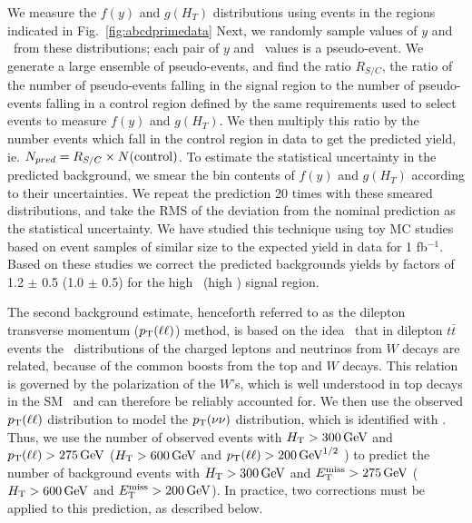 We measure the $f(y)$ and $g(H_T)$ distributions using events in the regions indicated in Fig.~\ref{fig:abcdprimedata}
Next, we randomly sample values of $y$ and \Ht\ from these distributions; each pair of $y$ and \Ht\ values is a pseudo-event.
We generate a large ensemble of pseudo-events, and find the ratio $R_{S/C}$, the ratio of the
number of pseudo-events falling in the signal region to the number of pseudo-events
falling in a control region defined by the same requirements used to select events
to measure $f(y)$ and $g(H_T)$. We then
multiply this ratio by the number events which fall in the control region in data
to get the predicted yield, ie. $N_{pred} = R_{S/C} \times N({\rm control})$. 
To estimate the statistical uncertainty in the predicted background, we smear the bin contents
of $f(y)$ and $g(H_T)$ according to their uncertainties. We repeat the prediction 20 times
with these smeared distributions, and take the RMS of the deviation from the nominal prediction
as the statistical uncertainty. We have studied this technique using toy MC studies based on
event samples of similar size to the expected yield in data for 1 fb$^{-1}$.
Based on these studies we correct the predicted backgrounds yields by factors of 1.2 $\pm$ 0.5
(1.0 $\pm$ 0.5) for the high \MET\ (high \Ht) signal region.


The second  background estimate, henceforth referred to as the dilepton transverse momentum ($p_{\mathrm{T}}(\ell\ell)$) method, 
is  based on the  idea~\cite{ref:victory} that  in dilepton  $t\bar{t}$  events the
\pt\  distributions of  the charged  leptons and  neutrinos  from $W$
decays are  related, because of the  common boosts from  the top  and $W$
decays.  This relation  is governed by the polarization  of the $W$'s,
which         is         well         understood        in         top
decays in the SM~\cite{Wpolarization,Wpolarization2}   and   can  therefore   be
reliably  accounted   for.   We then  use   the  observed
$p_{\mathrm{T}}(\ell\ell)$ distribution to  model the $p_{\mathrm{T}}(\nu\nu)$ distribution,
which is  identified with \MET.  Thus,  we use the  number of observed
events  with $H_{\mathrm{T}} > 300\,\text{Ge\hspace{-.08em}V}$ and $p_{\mathrm{T}}(\ell\ell)  > 275\,\text{Ge\hspace{-.08em}V}$ 
($H_{\mathrm{T}} > 600\,\text{Ge\hspace{-.08em}V}$ and $p_{\mathrm{T}}(\ell\ell)  > 200\,\text{Ge\hspace{-.08em}V}^{1/2}$ )
to predict the  number of  background events  with 
$H_{\mathrm{T}} >  300\,\text{Ge\hspace{-.08em}V}$ and  $E_{\mathrm{T}}^{\text{miss}} > 275\,\text{Ge\hspace{-.08em}V}$ ($H_{\mathrm{T}} >  600\,\text{Ge\hspace{-.08em}V}$ and  $E_{\mathrm{T}}^{\text{miss}} > 200\,\text{Ge\hspace{-.08em}V}$).  
In  practice, two corrections must be applied to this prediction, as described below.

